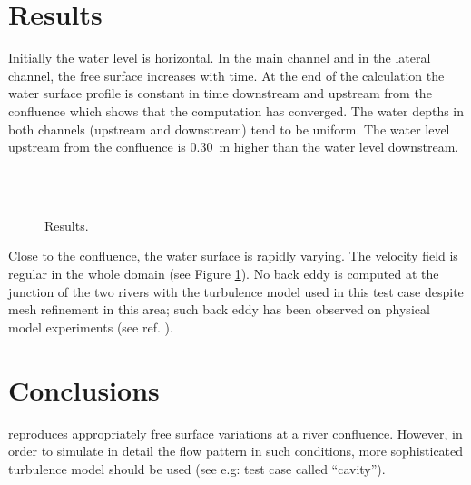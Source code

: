 \section{Results}

Initially the water level is horizontal.
In the main channel and in the lateral channel, the free surface increases with
time.
At the end of the calculation the water surface profile is constant in time
downstream and upstream from the confluence which shows that the computation has
converged.
The water depths in both channels (upstream and downstream) tend to be uniform.
The water level upstream from the confluence is 0.30~m higher than the water
level downstream.

\begin{figure}[H]
  \centering
   \\
  \\
  \caption{Results.}\label{t2d:confluence:results}
\end{figure}

Close to the confluence, the water surface is rapidly varying.
The velocity field is regular in the whole domain (see Figure
\ref{t2d:confluence:results}).
No back eddy is computed at the junction of the two rivers with the turbulence
model used in this test case despite mesh refinement in this area; such back
eddy has been observed on physical model experiments (see ref.
\cite{KumarGurram1997}).

\section{Conclusions}
 reproduces appropriately free surface variations at a river
confluence. However, in order to simulate in detail the flow pattern in such
conditions, more sophisticated turbulence model should be used (see e.g: test
case called ``cavity'').

